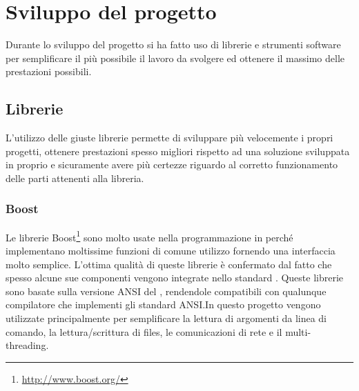 \chapter{Sviluppo del progetto}
\label{sw_devel}

Durante lo sviluppo del progetto si ha fatto uso di librerie e strumenti
software per semplificare il pi\`u possibile il lavoro da svolgere ed ottenere
il massimo delle prestazioni possibili. 

\section{Librerie}
L'utilizzo delle giuste librerie permette di sviluppare pi\`u velocemente i
propri progetti, ottenere prestazioni spesso migliori rispetto ad una soluzione
sviluppata in proprio e sicuramente avere pi\`u certezze riguardo al corretto
funzionamento delle parti attenenti alla libreria.

\subsection{Boost}
Le librerie Boost\footnote{\url{http://www.boost.org/}} sono molto usate nella
programmazione in \CC perch\'e implementano moltissime funzioni di comune
utilizzo fornendo una interfaccia molto semplice. L'ottima qualit\`a di queste
librerie \`e confermato dal fatto che spesso alcune sue componenti vengono
integrate nello standard \CC. Queste librerie sono basate sulla versione ANSI
del \CC, rendendole compatibili con qualunque compilatore che implementi gli
standard ANSI.In questo progetto vengono utilizzate principalmente per
semplificare la lettura di argomenti da linea di comando, la lettura/scrittura
di files, le comunicazioni di rete e il multi-threading.

